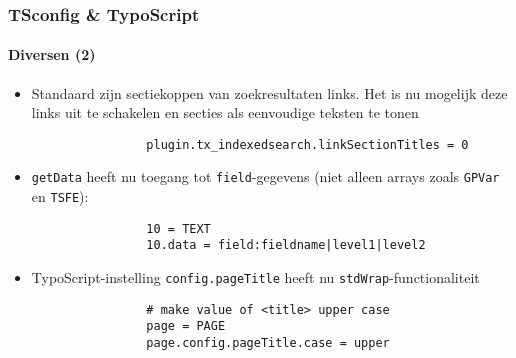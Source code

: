 \begin{frame}[fragile]
	\frametitle{TSconfig \& TypoScript}
	\framesubtitle{Diversen (2)}

	\begin{itemize}

		\item Standaard zijn sectiekoppen van zoekresultaten links.
			Het is nu mogelijk deze links uit te schakelen en secties als eenvoudige teksten te tonen

			\begin{lstlisting}
				plugin.tx_indexedsearch.linkSectionTitles = 0
			\end{lstlisting}

		\item \texttt{getData} heeft nu toegang tot \texttt{field}-gegevens (niet alleen arrays
			zoals \texttt{GPVar} en \texttt{TSFE}):
		
			\begin{lstlisting}
				10 = TEXT
				10.data = field:fieldname|level1|level2
			\end{lstlisting}

		\item TypoScript-instelling \texttt{config.pageTitle} heeft nu \texttt{stdWrap}-functionaliteit

			\begin{lstlisting}
				# make value of <title> upper case
				page = PAGE
				page.config.pageTitle.case = upper
			\end{lstlisting}

	\end{itemize}

\end{frame}

